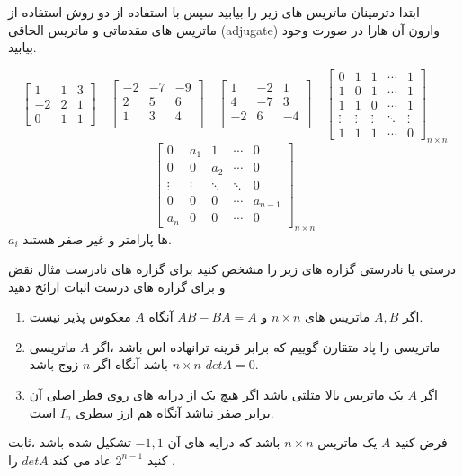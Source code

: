 \documentclass{article}
\begin{document}


ابتدا دترمینان ماتریس های زیر را بیابید سپس با استفاده از دو روش استفاده از ماتریس های مقدماتی و ماتریس الحاقی (adjugate) وارون آن هارا در صورت وجود بیابید.
 
$$\begin{bmatrix}
1&1&3\\
-2&2&1\\
0&1&1
\end{bmatrix}\quad 
\begin{bmatrix}
-2&-7&-9\\
2&5&6\\
1&3&4\\
\end{bmatrix}\quad 
\begin{bmatrix}
1&-2&1\\
4&-7&3\\
-2&6&-4\\
\end{bmatrix}\quad
\begin{bmatrix} 
0&1&1&\cdots&1\\
1&0&1&\cdots&1\\
1&1&0&\cdots&1\\
\vdots&\vdots&\vdots&\ddots&\vdots\\
1&1&1&\cdots&0
\end{bmatrix}_{n\times n}$$$$
\begin{bmatrix} 
0&a_1&1&\cdots&0\\
0&0&a_2&\cdots&0\\
\vdots&\vdots&\ddots&\ddots&0\\
0&0&0&\cdots&a_{n-1}\\
a_n&0&0&\cdots&0
\end{bmatrix}_{n\times n}
$$
$a_i$
ها پارامتر و غیر صفر هستند.


درستی یا نادرستی گزاره های زیر را مشخص کنید برای گزاره های نادرست مثال نقض و برای گزاره های درست اثبات ارائخ دهید
\begin{enumerate}
\item 
اگر 
$A,B$
ماتریس های 
$n\times n $
و 
$AB-BA=A$
آنگاه 
$A$
معکوس پذیر نیست.
\item 
	ماتریسی را پاد متقارن گوییم که برابر قرینه ترانهاده اس باشد ،اگر 
	$A$
	ماتریسی 
	$n\times n$
	باشد آنگاه اگر 
	$n$
	زوج باشد
	$det A=0$.
	\item 
	اگر 
	$A$
	یک ماتریس بالا مثلثی باشد اگر هیچ یک از درایه های روی قطر اصلی آن برابر صفر نباشد آنگاه هم ارز سطری 
	$I_n$
	است.
\end{enumerate}
فرض کنید 
$A$
یک ماتریس 
$n\times n$
باشد که درایه های آن 
$-1,1$
تشکیل شده باشد ،ثابت کنید 
$2^{n-1}$
عاد می کند 
$det A$
را .
\end{document}
